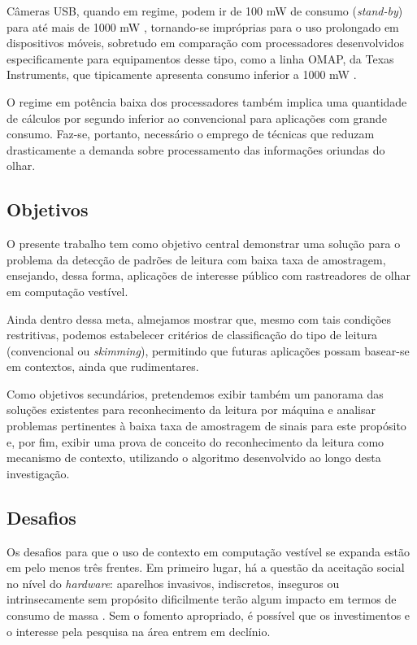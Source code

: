 \documentclass[12pt]{article}
\begin{document}
		Câmeras USB, quando em regime, podem ir de 100 mW de consumo (\textit{stand-by}) para até mais de 1000 mW \cite{Toms_Hardware}, tornando-se impróprias para o uso prolongado em dispositivos móveis, sobretudo em comparação com processadores desenvolvidos especificamente para equipamentos desse tipo, como a linha OMAP, da Texas Instruments, que tipicamente apresenta consumo inferior a 1000 mW \cite{OMAP}.

		O regime em potência baixa dos processadores também implica uma quantidade de cálculos por segundo inferior ao convencional para aplicações com grande consumo. Faz-se, portanto, necessário o emprego de técnicas que reduzam drasticamente a demanda sobre processamento das informações oriundas do olhar.
	
		\subsection{Objetivos}
		O presente trabalho tem como objetivo central demonstrar uma solução para o problema da detecção de padrões de leitura com baixa taxa de amostragem, ensejando, dessa forma, aplicações de interesse público com rastreadores de olhar em computação vestível.
		
		Ainda dentro dessa meta, almejamos mostrar que, mesmo com tais condições restritivas, podemos estabelecer critérios de classificação do tipo de leitura (convencional ou \textit{skimming}), permitindo que futuras aplicações possam basear-se em contextos, ainda que rudimentares. 
		
		Como objetivos secundários, pretendemos exibir também um panorama das soluções existentes para reconhecimento da leitura por máquina e analisar problemas pertinentes à baixa taxa de amostragem de sinais para este propósito e, por fim, exibir uma prova de conceito do reconhecimento da leitura como mecanismo de contexto, utilizando o algoritmo desenvolvido ao longo desta investigação.
		
		\subsection{Desafios}
		Os desafios para que o uso de contexto em computação vestível se expanda estão em pelo menos três frentes. Em primeiro lugar, há a questão da aceitação social no nível do \textit{hardware}: aparelhos invasivos, indiscretos, inseguros ou intrinsecamente sem propósito dificilmente terão algum impacto em termos de consumo de massa \cite{Mann-1998}. Sem o fomento apropriado, é possível que os investimentos e o interesse pela pesquisa na área entrem em declínio.
		
\end{document}
